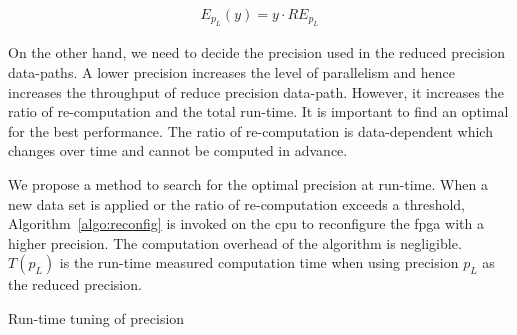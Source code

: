 \begin{equation}
\begin{aligned}
E_{p_L}(y) = y \cdot RE_{p_L}
\end{aligned}
\label{eqt:error}
\end{equation}

On the other hand, we need to decide the precision used in the reduced precision data-paths.
A lower precision increases the level of parallelism and hence increases the throughput of reduce precision data-path.
However, it increases the ratio of re-computation and the total run-time.
It is important to find an optimal for the best performance.
The ratio of re-computation is data-dependent which changes over time and cannot be computed in advance.

We propose a method to search for the optimal precision at run-time.
When a new data set is applied or the ratio of re-computation exceeds a threshold,
Algorithm~\ref{algo:reconfig} is invoked on the \gls{cpu} to reconfigure the \gls{fpga} with a higher precision.
The computation overhead of the algorithm is negligible.
$T(p_L)$ is the run-time measured computation time when using precision $p_L$ as the reduced precision.

\begin{algorithm}[t!]
\caption{Run-time tuning of precision}
\begin{algorithmic}[1]
\REPEAT
\end{algorithmic}
\label{algo:reconfig}
\end{algorithm}



